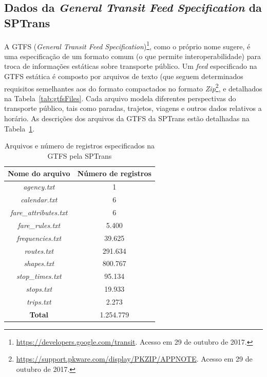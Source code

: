 \documentclass[
	12pt,				%
	oneside,			%
	a4paper,			%
	english,			%
	brazil				%
	]{abntex2ppgsi}
\begin{document}
{{\subsection{Dados da \textit{General Transit Feed Specification} da SPTrans}
\label{gtfs}

A GTFS (\textit{General Transit Feed Specification})\footnote{\label{googleTransit}\url{https://developers.google.com/transit}. Acesso em 29 de outubro de 2017.}, como o próprio nome sugere, é uma especificação de um formato comum (o que permite interoperabilidade) para troca de informações estáticas sobre transporte público.  Um \textit{feed} especificado na GTFS estática é composto por arquivos de texto (que seguem determinados requisitos semelhantes aos do formato   compactados no formato \textit{Zip}\footnote{\url{https://support.pkware.com/display/PKZIP/APPNOTE}. Acesso em 29 de outubro de 2017.}, e detalhados na Tabela~\ref{tab:gtfsFiles}. Cada arquivo modela diferentes perspectivas do transporte público, tais como paradas, trajetos, viagens e outros dados relativos a horário. As descrições dos arquivos da GTFS da SPTrans estão detalhadas na Tabela~\ref{tab:gtfs}.


\begin{table}[!htb]
\centering
\caption{Arquivos e número de registros especificados na GTFS pela SPTrans}
	\label{tab:gtfs}
\begin{tabular}{c|c}
\toprule
\textbf{Nome do arquivo} & \textbf{Número de registros} \\ 
\midrule
\textit{agency.txt} & 1 \\ 
\hline
\textit{calendar.txt} & 6 \\ 
\hline
\textit{fare\_attributes.txt} & 6 \\ 
\hline
\textit{fare\_rules.txt} & 5.400 \\
\hline
\textit{frequencies.txt} & 39.625 \\
\hline
\textit{routes.txt} & 291.634 \\
\hline
\textit{shapes.txt} & 800.767 \\
\hline
\textit{stop\_times.txt} & 95.134 \\  
\hline
\textit{stops.txt} & 19.933 \\ 
\hline
\textit{trips.txt} & 2.273 \\
\midrule
\midrule
\textbf{Total} & 1.254.779 \\
\bottomrule
\end{tabular}
\end{table}

}}
\end{document}
